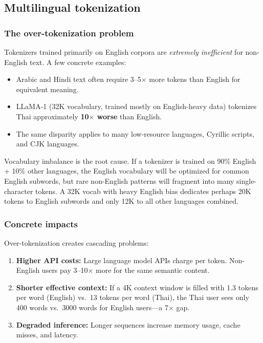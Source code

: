 \subsection{Multilingual tokenization}

\subsubsection*{The over-tokenization problem}

Tokenizers trained primarily on English corpora are \emph{extremely inefficient} for non-English text. A few concrete examples:

\begin{itemize}
  \item Arabic and Hindi text often require 3–5$\times$ more tokens than English for equivalent meaning.
  \item LLaMA-1 (32K vocabulary, trained mostly on English-heavy data) tokenizes Thai approximately \textbf{10$\times$ worse} than English.
  \item The same disparity applies to many low-resource languages, Cyrillic scripts, and CJK languages.
\end{itemize}

\begin{paperbox}[title={Why the fertility gap?}]
Vocabulary imbalance is the root cause. If a tokenizer is trained on 90\% English + 10\% other languages, the English vocabulary will be optimized for common English subwords, but rare non-English patterns will fragment into many single-character tokens. A 32K vocab with heavy English bias dedicates perhaps 20K tokens to English subwords and only 12K to all other languages combined.
\end{paperbox}

\subsubsection*{Concrete impacts}

Over-tokenization creates cascading problems:

\begin{enumerate}
  \item \textbf{Higher API costs:} Large language model APIs charge per token. Non-English users pay 3–10$\times$ more for the same semantic content.
  \item \textbf{Shorter effective context:} If a 4K context window is filled with 1.3 tokens per word (English) vs.\ 13 tokens per word (Thai), the Thai user sees only 400 words vs.\ 3000 words for English users—a 7$\times$ gap.
  \item \textbf{Degraded inference:} Longer sequences increase memory usage, cache misses, and latency.
\end{enumerate}


